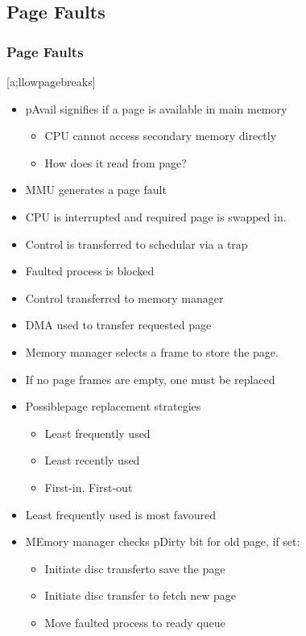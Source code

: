 \documentclass{beamer}
\begin{document}
\subsection{Page Faults}
\begin{frame}
\frametitle{Page Faults}[a;llowpagebreaks]
\begin{itemize}
\item pAvail signifies if a page is available in main memory
\begin{itemize}
\item CPU cannot access secondary memory directly
\item How does it read from page?
\end{itemize}
\item MMU generates a page fault
\item CPU is interrupted and required page is swapped in.
\item Control is transferred to schedular via a trap
\item Faulted process is blocked
\item Control transferred to memory manager
\item DMA used to transfer requested page
\item Memory manager selects a frame to store the page.
\item If no page frames are empty, one must be replaced
\item Possiblepage replacement strategies
\begin{itemize}
\item Least frequently used
\item Least recently used
\item First-in, First-out
\end{itemize}
\item Least frequently used is most favoured
\item MEmory manager checks pDirty bit for old page, if set:
\begin{itemize}
\item Initiate disc transferto save the page
\item Initiate disc transfer to fetch new page
\item Move faulted process to ready queue
\end{itemize}
\end{itemize}
\end{frame}
\end{document}
